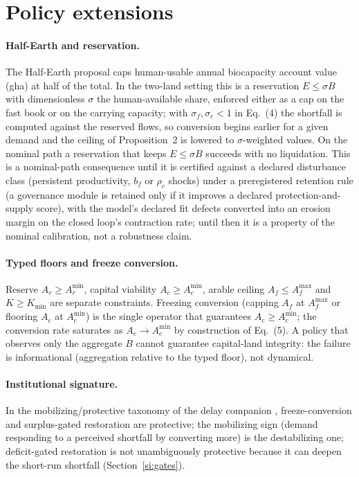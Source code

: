 \documentclass[11pt,a4paper]{article}
\newcommand{\Acmin}{A_c^{\min}}
\begin{document}
\section{Policy extensions}\label{si:policy}

\paragraph{Half-Earth and reservation.} The Half-Earth proposal \citep{Wilson2016} caps human-usable annual biocapacity account value (gha) at half of the total. In the two-land setting this is a reservation $E\le\sigma B$ with dimensionless $\sigma$ the human-available share, enforced either as a cap on the fast book or on the carrying capacity; with $\sigma_f,\sigma_c<1$ in Eq.~(4) the shortfall is computed against the reserved flows, so conversion begins earlier for a given demand and the ceiling of Proposition~2 is lowered to $\sigma$-weighted values. On the nominal path a reservation that keeps $E\le\sigma B$ succeeds with no liquidation. This is a nominal-path consequence until it is certified against a declared disturbance class (persistent productivity, $b_f$ or $\rho_c$ shocks) under a preregistered retention rule (a governance module is retained only if it improves a declared protection-and-supply score), with the model's declared fit defects converted into an erosion margin on the closed loop's contraction rate; until then it is a property of the nominal calibration, not a robustness claim.

\paragraph{Typed floors and freeze conversion.} Reserve $A_r\ge A_r^{\min}$, capital viability $A_c\ge\Acmin$, arable ceiling $A_f\le A_f^{\max}$ and $K\ge K_{\min}$ are separate constraints. Freezing conversion (capping $A_f$ at $A_f^{\max}$ or flooring $A_c$ at $\Acmin$) is the single operator that guarantees $A_c\ge\Acmin$; the conversion rate saturates as $A_c\to\Acmin$ by construction of Eq.~(5). A policy that observes only the aggregate $B$ cannot guarantee capital-land integrity: the failure is informational (aggregation relative to the typed floor), not dynamical.

\paragraph{Institutional signature.} In the mobilizing/protective taxonomy of the delay companion \citep{Abaee2026a}, freeze-conversion and surplus-gated restoration are protective; the mobilizing sign (demand responding to a perceived shortfall by converting more) is the destabilizing one; deficit-gated restoration is not unambiguously protective because it can deepen the short-run shortfall (Section~\ref{si:gates}).
\end{document}
